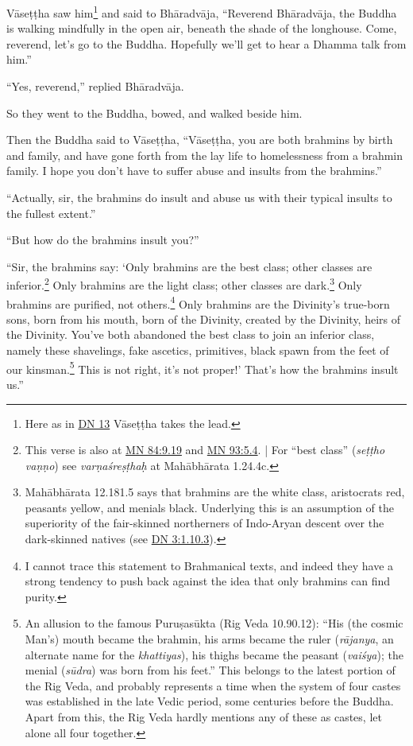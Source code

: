 \documentclass[12pt,openany]{book}%
\begin{document}
\textsanskrit{Vāseṭṭha} saw him\footnote{Here as in \href{https://suttacentral.net/dn13/en/sujato}{DN 13} \textsanskrit{Vāseṭṭha} takes the lead. } and said to \textsanskrit{Bhāradvāja}, “Reverend \textsanskrit{Bhāradvāja}, the Buddha is walking mindfully in the open air, beneath the shade of the longhouse. Come, reverend, let’s go to the Buddha. Hopefully we’ll get to hear a Dhamma talk from him.” 

“Yes, reverend,” replied \textsanskrit{Bhāradvāja}. 

So they went to the Buddha, bowed, and walked beside him. 

Then the Buddha said to \textsanskrit{Vāseṭṭha}, “\textsanskrit{Vāseṭṭha}, you are both brahmins by birth and family, and have gone forth from the lay life to homelessness from a brahmin family. I hope you don’t have to suffer abuse and insults from the brahmins.” 

“Actually, sir, the brahmins do insult and abuse us with their typical insults to the fullest extent.” 

“But how do the brahmins insult you?” 

“Sir, the brahmins say: ‘Only brahmins are the best class; other classes are inferior.\footnote{This verse is also at \href{https://suttacentral.net/mn84/en/sujato\#9.19}{MN 84:9.19} and \href{https://suttacentral.net/mn93/en/sujato\#5.4}{MN 93:5.4}. | For “best class” (\textit{\textsanskrit{seṭṭho} \textsanskrit{vaṇṇo}}) see \textit{\textsanskrit{varṇaśreṣṭhaḥ}} at \textsanskrit{Mahābhārata} 1.24.4c. } Only brahmins are the light class; other classes are dark.\footnote{\textsanskrit{Mahābhārata} 12.181.5 says that brahmins are the white class, aristocrats red, peasants yellow, and menials black. Underlying this is an assumption of the superiority of the fair-skinned northerners of Indo-Aryan descent over the dark-skinned natives (see \href{https://suttacentral.net/dn3/en/sujato\#1.10.3}{DN 3:1.10.3}). } Only brahmins are purified, not others.\footnote{I cannot trace this statement to Brahmanical texts, and indeed they have a strong tendency to push back against the idea that only brahmins can find purity. } Only brahmins are the Divinity’s true-born sons, born from his mouth, born of the Divinity, created by the Divinity, heirs of the Divinity. You’ve both abandoned the best class to join an inferior class, namely these shavelings, fake ascetics, primitives, black spawn from the feet of our kinsman.\footnote{An allusion to the famous \textsanskrit{Puruṣasūkta} (Rig Veda 10.90.12): “His (the cosmic Man’s) mouth became the brahmin, his arms became the ruler (\textit{\textsanskrit{rājanya}}, an alternate name for the \textit{khattiyas}), his thighs became the peasant (\textit{\textsanskrit{vaiśya}}); the menial (\textit{\textsanskrit{sūdra}}) was born from his feet.” This belongs to the latest portion of the Rig Veda, and probably represents a time when the system of four castes was established in the late Vedic period, some centuries before the Buddha. Apart from this, the Rig Veda hardly mentions any of these as castes, let alone all four together. } This is not right, it’s not proper!’ That’s how the brahmins insult us.” 
\end{document}
